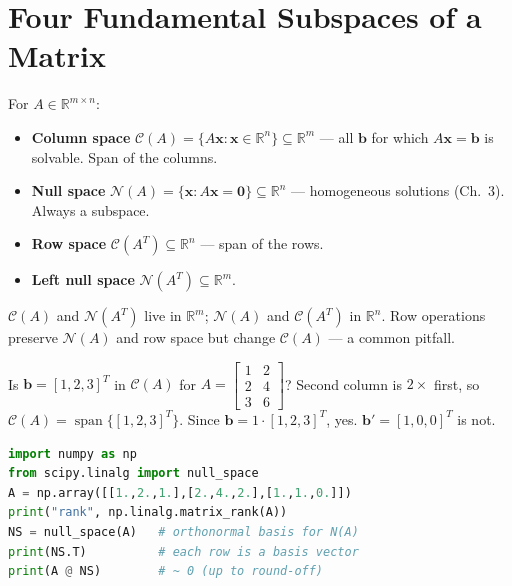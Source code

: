 \section{Four Fundamental Subspaces of a Matrix}
\label{sec:four-subspaces}
For $A\in\mathbb{R}^{m\times n}$:
\begin{itemize}
    \item \textbf{Column space} $\mathcal{C}(A)=\{A\mathbf{x}:\mathbf{x}\in\mathbb{R}^n\}\subseteq\mathbb{R}^m$ --- all $\mathbf{b}$ for which $A\mathbf{x}=\mathbf{b}$ is solvable. Span of the columns.
    \item \textbf{Null space} $\mathcal{N}(A)=\{\mathbf{x}:A\mathbf{x}=\mathbf{0}\}\subseteq\mathbb{R}^n$ --- homogeneous solutions (Ch.~3). Always a subspace.
    \item \textbf{Row space} $\mathcal{C}(A^T)\subseteq\mathbb{R}^n$ --- span of the rows.
    \item \textbf{Left null space} $\mathcal{N}(A^T)\subseteq\mathbb{R}^m$.
\end{itemize}
$\mathcal{C}(A)$ and $\mathcal{N}(A^T)$ live in $\mathbb{R}^m$; $\mathcal{N}(A)$ and $\mathcal{C}(A^T)$ in $\mathbb{R}^n$. Row operations preserve $\mathcal{N}(A)$ and row space but change $\mathcal{C}(A)$ --- a common pitfall.

\begin{example}[Membership]
Is $\mathbf{b}=[1,2,3]^T$ in $\mathcal{C}(A)$ for $A=\begin{bmatrix}1&2\\2&4\\3&6\end{bmatrix}$? Second column is $2\times$ first, so $\mathcal{C}(A)=\operatorname{span}\{[1,2,3]^T\}$. Since $\mathbf{b}=1\cdot[1,2,3]^T$, yes. $\mathbf{b}'=[1,0,0]^T$ is not.
\end{example}

\begin{example}
\begin{lstlisting}[language=Python]
import numpy as np
from scipy.linalg import null_space
A = np.array([[1.,2.,1.],[2.,4.,2.],[1.,1.,0.]])
print("rank", np.linalg.matrix_rank(A))
NS = null_space(A)   # orthonormal basis for N(A)
print(NS.T)          # each row is a basis vector
print(A @ NS)        # ~ 0 (up to round-off)
\end{lstlisting}
\end{example}


